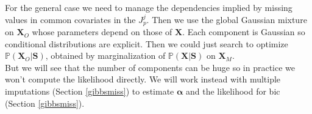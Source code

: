 \documentclass[12pt,a4paper]{report}
\begin{document}
		For the general case we need to manage the dependencies implied by missing values in common covariates in the $J_p^j$. Then we use the global Gaussian mixture on $\boldsymbol{X}_O$ whose parameters depend on those of $\boldsymbol{X}$. Each component is Gaussian so conditional distributions are explicit. Then we could just search to optimize $\mathbb{P}(\boldsymbol{X}_O|\boldsymbol{S})$, obtained by marginalization of $\mathbb{P}(\boldsymbol{X}|\boldsymbol{S})$ on $\boldsymbol{X}_M$.\\
		
		 But we will see that the number of components can be huge so in practice we won't compute the likelihood directly. We will work instead with multiple imputations (Section \ref{gibbsmiss}) to estimate $\boldsymbol{\alpha}$ and the likelihood for {\sc bic} (Section \ref{gibbsmiss}).  
%		


		
\end{document}
